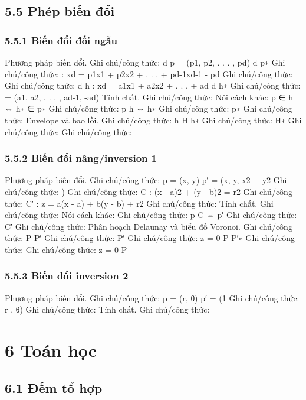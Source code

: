 \documentclass[11pt]{article}
\begin{document}
\subsection{5.5 Phép biến đổi}
\subsubsection{5.5.1 Biến đổi đối ngẫu}
\begin{NoteBlock}
Phương pháp biến đổi.
Ghi chú/công thức: d   p = (p1, p2, . . . , pd)   d   p∗
Ghi chú/công thức: : xd = p1x1 + p2x2 + . . . + pd-1xd-1 - pd
Ghi chú/công thức: 
Ghi chú/công thức: d   h : xd = a1x1 + a2x2 + . . . + ad   d   h∗
Ghi chú/công thức: = (a1, a2, . . . , ad-1, -ad)
Tính chất.
Ghi chú/công thức: 
Nói cách khác:
p ∈ h ⇔ h∗
∈ p∗
Ghi chú/công thức: p   h   ⇔ h∗
Ghi chú/công thức: p∗
Ghi chú/công thức: 
Envelope và bao lồi.
Ghi chú/công thức: h   H   h∗
Ghi chú/công thức: H∗
Ghi chú/công thức: 
Ghi chú/công thức: 
\end{NoteBlock}
\subsubsection{5.5.2 Biến đổi nâng/inversion 1}
\begin{NoteBlock}
Phương pháp biến đổi.
Ghi chú/công thức: p = (x, y)   p′
= (x, y, x2
+ y2
Ghi chú/công thức: )
Ghi chú/công thức: C : (x - a)2
+ (y - b)2
= r2
Ghi chú/công thức: C′
: z = a(x - a) + b(y - b) + r2
Ghi chú/công thức: 
Tính chất.
Ghi chú/công thức: 
Nói cách khác:
Ghi chú/công thức: p   C   ⇔ p′
Ghi chú/công thức: C′
Ghi chú/công thức: 
Phân hoạch Delaunay và biểu đồ Voronoi.
Ghi chú/công thức: P   P′
Ghi chú/công thức: 
P′
Ghi chú/công thức: z = 0   P  P′∗
Ghi chú/công thức: 
Ghi chú/công thức: z = 0   P
\end{NoteBlock}
\subsubsection{5.5.3 Biến đổi inversion 2}
\begin{NoteBlock}
Phương pháp biến đổi.
Ghi chú/công thức: p = (r, θ)   p′
= (1
Ghi chú/công thức: r , θ)
Ghi chú/công thức: 
Tính chất.
Ghi chú/công thức: 
\end{NoteBlock}
\section{6 Toán học}
\subsection{6.1 Đếm tổ hợp}
\end{document}
